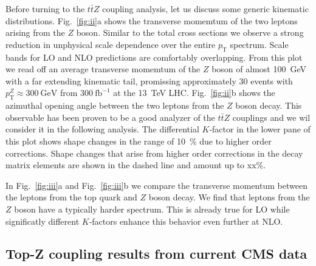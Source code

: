 \documentclass[preprint]{JHEP3} %
\newcommand{\GeV}{\mathrm{GeV}}
\newcommand{\pT}{p_{\mathrm{T}}}
\def\ttbZ{t\bar{t}Z}
\begin{document}
Before turning to the $\ttbZ$ coupling analysis, let us discuss some generic kinematic distributions.
Fig.~\ref{fig:ii}a shows the transverse momemtum of the two leptons arising from the $Z$ boson.
Similar to the total cross sections we observe a strong reduction in unphysical scale dependence over the entire $\pT$ spectrum.
Scale bands for LO and NLO predictions are comfortably overlapping. 
From this plot we read off an average transverse momemtum of the $Z$ boson of almost 100~GeV with a far extending kinematic tail,
promissing approximately 30 events with $\pT^Z \approx 300~\GeV$ from $300~\mathrm{fb}^{-1}$ at the 13~TeV LHC. 
Fig.~\ref{fig:ii}b shows the azimuthal opening angle between the two leptons from the $Z$ boson decay.
This observable has been proven to be a good analyzer of the $\ttbZ$ couplings \cite{Baur:2004uw} and we wil consider it in the following analysis.
The differential $K$-factor in the lower pane of this plot shows shape changes in the range of 10~\% due to higher order corrections.
Shape changes that arise from higher order corrections in the decay matrix elements are shown in the dashed line and amount up to xx\%.



In Fig.~\ref{fig:iii}a and Fig.~\ref{fig:iii}b we compare the transverse momentum between the leptons from the top quark and $Z$ boson decay.
We find that leptons from the $Z$ boson have a typically harder spectrum. 
This is already true for LO while significatly different $K$-factors enhance this behavior even further at NLO.

\subsection{Top-Z coupling results from current CMS data}
\end{document}
